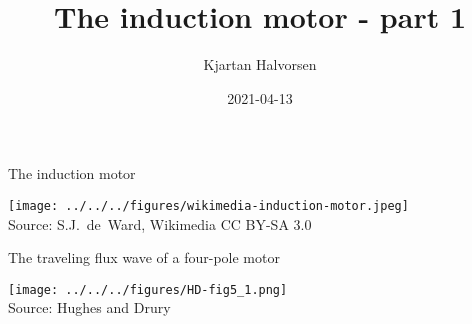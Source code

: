 \documentclass[dvisvgm,hypertex,aspectratio=169]{beamer}
\author{Kjartan Halvorsen}
\date{2021-04-13}
\title{The induction motor - part 1}
\begin{document}
\maketitle


\begin{frame}{The induction motor}

  \begin{center}
    \texttt{[image: ../../../figures/wikimedia-induction-motor.jpeg]}\\
    {\footnotesize Source: S.J.~de~Ward, Wikimedia CC BY-SA 3.0}
  \end{center}

\end{frame}


\begin{frame}{The traveling flux wave of a four-pole motor}

  \begin{center}
    \texttt{[image: ../../../figures/HD-fig5\_1.png]}\\
    {\footnotesize Source: Hughes and Drury}
  \end{center}

\end{frame}



%
%
\end{document}

